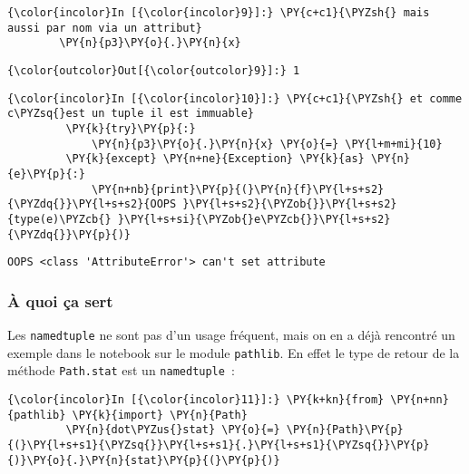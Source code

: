     \begin{Verbatim}[commandchars=\\\{\}]
{\color{incolor}In [{\color{incolor}9}]:} \PY{c+c1}{\PYZsh{} mais aussi par nom via un attribut}
        \PY{n}{p3}\PY{o}{.}\PY{n}{x}
\end{Verbatim}


\begin{Verbatim}[commandchars=\\\{\}]
{\color{outcolor}Out[{\color{outcolor}9}]:} 1
\end{Verbatim}
            
    \begin{Verbatim}[commandchars=\\\{\}]
{\color{incolor}In [{\color{incolor}10}]:} \PY{c+c1}{\PYZsh{} et comme c\PYZsq{}est un tuple il est immuable}
         \PY{k}{try}\PY{p}{:}
             \PY{n}{p3}\PY{o}{.}\PY{n}{x} \PY{o}{=} \PY{l+m+mi}{10}
         \PY{k}{except} \PY{n+ne}{Exception} \PY{k}{as} \PY{n}{e}\PY{p}{:}
             \PY{n+nb}{print}\PY{p}{(}\PY{n}{f}\PY{l+s+s2}{\PYZdq{}}\PY{l+s+s2}{OOPS }\PY{l+s+s2}{\PYZob{}}\PY{l+s+s2}{type(e)\PYZcb{} }\PY{l+s+si}{\PYZob{}e\PYZcb{}}\PY{l+s+s2}{\PYZdq{}}\PY{p}{)}
\end{Verbatim}


    \begin{Verbatim}[commandchars=\\\{\}]
OOPS <class 'AttributeError'> can't set attribute

    \end{Verbatim}

    \hypertarget{uxe0-quoi-uxe7a-sert}{%
\subsubsection{À quoi ça sert}\label{uxe0-quoi-uxe7a-sert}}

    Les \texttt{namedtuple} ne sont pas d'un usage fréquent, mais on en a
déjà rencontré un exemple dans le notebook sur le module
\texttt{pathlib}. En effet le type de retour de la méthode
\texttt{Path.stat} est un \texttt{namedtuple}~:

    \begin{Verbatim}[commandchars=\\\{\}]
{\color{incolor}In [{\color{incolor}11}]:} \PY{k+kn}{from} \PY{n+nn}{pathlib} \PY{k}{import} \PY{n}{Path}
         \PY{n}{dot\PYZus{}stat} \PY{o}{=} \PY{n}{Path}\PY{p}{(}\PY{l+s+s1}{\PYZsq{}}\PY{l+s+s1}{.}\PY{l+s+s1}{\PYZsq{}}\PY{p}{)}\PY{o}{.}\PY{n}{stat}\PY{p}{(}\PY{p}{)}
\end{Verbatim}


